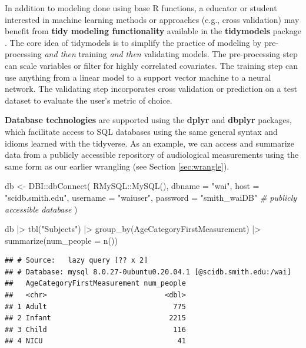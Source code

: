 \documentclass[12pt]{article}
\newenvironment{Shaded}{\begin{snugshade}}{\end{snugshade}}
\newcommand{\AttributeTok}[1]{\textcolor[rgb]{0.77,0.63,0.00}{#1}}
\newcommand{\CommentTok}[1]{\textcolor[rgb]{0.56,0.35,0.01}{\textit{#1}}}
\newcommand{\FunctionTok}[1]{\textcolor[rgb]{0.00,0.00,0.00}{#1}}
\newcommand{\NormalTok}[1]{#1}
\newcommand{\OtherTok}[1]{\textcolor[rgb]{0.56,0.35,0.01}{#1}}
\newcommand{\SpecialCharTok}[1]{\textcolor[rgb]{0.00,0.00,0.00}{#1}}
\newcommand{\StringTok}[1]{\textcolor[rgb]{0.31,0.60,0.02}{#1}}
\begin{document}
In addition to modeling done using base R functions, a educator or
student interested in machine learning methods or approaches (e.g.,
cross validation) may benefit from \textbf{tidy modeling functionality}
available in the \textbf{tidymodels} package \citep{R-tidymodels}. The
core idea of tidymodels is to simplify the practice of modeling by
pre-processing \emph{and then} training \emph{and then} validating
models. The pre-processing step can scale variables or filter for highly
correlated covariates. The training step can use anything from a linear
model to a support vector machine to a neural network. The validating
step incorporates cross validation or prediction on a test dataset to
evaluate the user's metric of choice.

\textbf{Database technologies} are supported using the \textbf{dplyr}
\citep{R-dplyr} and \textbf{dbplyr} \citep{R-dbplyr} packages, which
facilitate access to SQL databases using the same general syntax and
idioms learned with the tidyverse. As an example, we can access and
summarize data from a publicly accessible repository of audiological
measurements \citep{voss_2019} using the same form as our earlier
wrangling (see Section \ref{sec:wrangle}).

\linespread{1}

\begin{Shaded}
\begin{Highlighting}[]
\NormalTok{db }\OtherTok{\textless{}{-}}\NormalTok{ DBI}\SpecialCharTok{::}\FunctionTok{dbConnect}\NormalTok{(}
\NormalTok{  RMySQL}\SpecialCharTok{::}\FunctionTok{MySQL}\NormalTok{(),}
  \AttributeTok{dbname =} \StringTok{"wai"}\NormalTok{, }
  \AttributeTok{host =} \StringTok{"scidb.smith.edu"}\NormalTok{, }
  \AttributeTok{username =} \StringTok{"waiuser"}\NormalTok{, }
  \AttributeTok{password =} \StringTok{"smith\_waiDB"}  \CommentTok{\# publicly accessible database}
\NormalTok{)}

\NormalTok{db }\SpecialCharTok{|\textgreater{}}
  \FunctionTok{tbl}\NormalTok{(}\StringTok{"Subjects"}\NormalTok{) }\SpecialCharTok{|\textgreater{}} 
  \FunctionTok{group\_by}\NormalTok{(AgeCategoryFirstMeasurement) }\SpecialCharTok{|\textgreater{}}
  \FunctionTok{summarize}\NormalTok{(}\AttributeTok{num\_people =} \FunctionTok{n}\NormalTok{())}
\end{Highlighting}
\end{Shaded}

\begin{verbatim}
## # Source:   lazy query [?? x 2]
## # Database: mysql 8.0.27-0ubuntu0.20.04.1 [@scidb.smith.edu:/wai]
##   AgeCategoryFirstMeasurement num_people
##   <chr>                            <dbl>
## 1 Adult                              775
## 2 Infant                            2215
## 3 Child                              116
## 4 NICU                                41
\end{verbatim}
\end{document}
